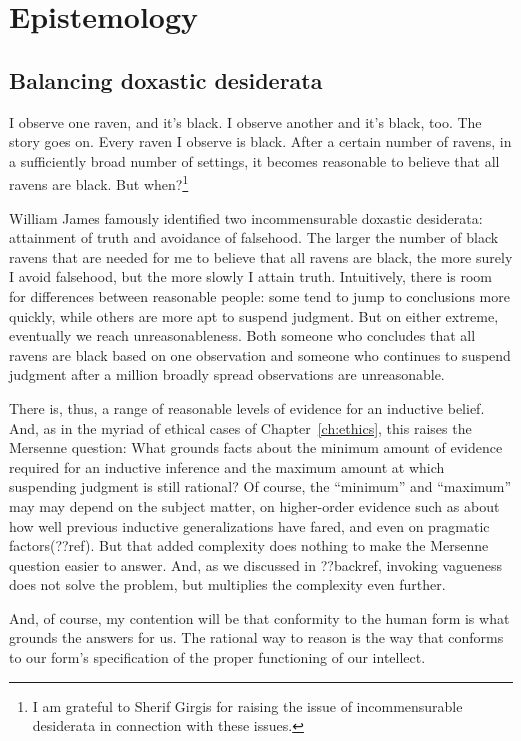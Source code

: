 \def\mychapter{V}

\chapter{Epistemology}\label{ch:epistemology}
\section{Balancing doxastic desiderata}
I observe one raven, and it's black. I observe another and it's black, too. The story goes on. Every
raven I observe is black. After a certain number of ravens, in a sufficiently broad number of settings,
it becomes reasonable to believe that all ravens are black. But when?\footnote{I am grateful to Sherif Girgis for raising the issue of incommensurable desiderata in connection with these issues.}

William James famously identified two incommensurable doxastic desiderata: attainment of truth and avoidance of falsehood.
The larger the number of black ravens that are needed for me to believe that all ravens are black, the more surely
I avoid falsehood, but the more slowly I attain truth. Intuitively, there is room for differences between reasonable
people: some tend to jump to conclusions more quickly, while others are more apt to suspend judgment. But on either
extreme, eventually we reach unreasonableness. Both someone who concludes that all ravens are black based on one 
observation and someone who continues to suspend judgment after a million broadly spread observations are unreasonable.

There is, thus, a range of reasonable levels of evidence for an inductive belief. And, as in the myriad of ethical
cases of Chapter~\ref{ch:ethics}, this raises the Mersenne question: What grounds facts about the minimum amount of 
evidence required for an inductive inference and the maximum amount at which suspending judgment is still rational? 
Of course, the ``minimum'' and ``maximum'' may may depend on the subject matter, on higher-order evidence such as about 
how well previous inductive generalizations have fared, and even on pragmatic factors(??ref). But that added complexity does
nothing to make the Mersenne question easier to answer. And, as we discussed in ??backref, invoking vagueness does not
solve the problem, but multiplies the complexity even further.

And, of course, my contention will be that conformity to the human form is what grounds the answers for us. The
rational way to reason is the way that conforms to our form's specification of the proper functioning of our intellect.

